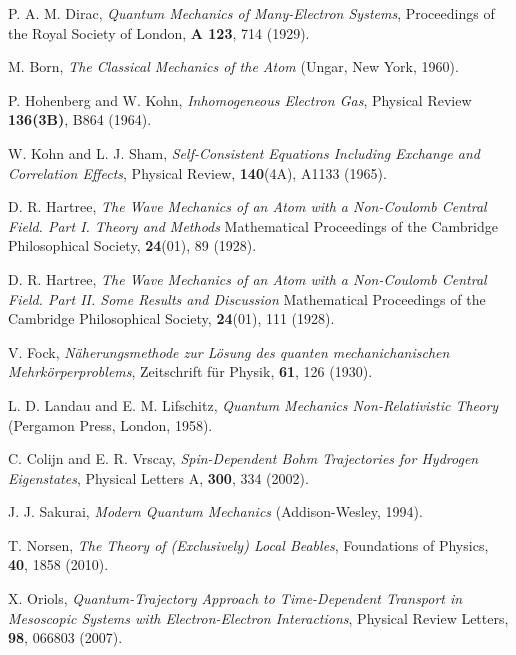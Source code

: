 \documentclass[onecolumn,nofootinbib, secnumarabic, amsmath, nobibnotes,11pt,aps,pra]{revtex4-1}
\begin{document}
\begin{thebibliography}{999}
P. A. M. Dirac, \emph{Quantum Mechanics of Many-Electron Systems}, Proceedings of the Royal Society of London, \textbf{A 123},  714 (1929).

M. Born, \emph{The Classical Mechanics of the Atom} (Ungar, New York, 1960).

P. Hohenberg and W. Kohn, \emph{Inhomogeneous Electron Gas}, Physical Review {\bf 136(3B)},  B864 (1964).

W. Kohn and L. J. Sham, \emph{Self-Consistent Equations Including Exchange and Correlation Effects}, Physical Review, \textbf{140}(4A),  A1133  (1965).

D. R. Hartree, \emph{The Wave Mechanics of an Atom with a Non-Coulomb Central Field. Part I. Theory and Methods} Mathematical Proceedings of the Cambridge Philosophical Society, \textbf{24}(01),  89 (1928).

D. R. Hartree, \emph{The Wave Mechanics of an Atom with a Non-Coulomb Central Field. Part II. Some Results and Discussion} Mathematical Proceedings of the Cambridge Philosophical Society, \textbf{24}(01),  111 (1928).

V. Fock, \emph{N\"{a}herungsmethode zur L\"{o}sung des quanten mechanichanischen Mehrk\"{o}rperproblems}, Zeitschrift f\"{u}r Physik, \textbf{61},  126 (1930).

L. D. Landau and E. M. Lifschitz, \emph{Quantum Mechanics Non-Relativistic Theory} (Pergamon Press, London, 1958).

C. Colijn and E. R. Vrscay, \emph{Spin-Dependent Bohm Trajectories for Hydrogen Eigenstates}, Physical Letters A, \textbf{300}, 334 (2002).

J. J. Sakurai, \emph{Modern Quantum Mechanics} (Addison-Wesley, 1994).

T. Norsen, \textit{The Theory of (Exclusively) Local Beables}, Foundations of Physics, \textbf{40}, 1858 (2010).

X. Oriols, \emph{Quantum-Trajectory Approach to Time-Dependent Transport in Mesoscopic Systems with Electron-Electron Interactions}, Physical Review Letters, \textbf{98},  066803 (2007).


\end{thebibliography}
\end{document}
